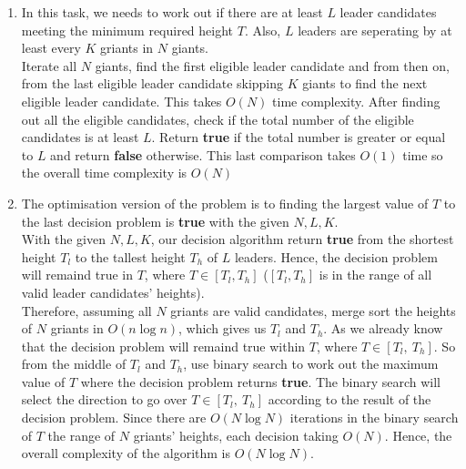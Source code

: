 \documentclass[a4paper]{scrartcl}
\begin{document}
\begin{enumerate}[label=(\alph*)]
  \item In this task, we needs to work out if there are at least $L$ leader candidates meeting the minimum required height $T$. Also, $L$ leaders are seperating by at least every $K$ griants in $N$ giants.\\
  Iterate all $N$ giants, find the first eligible leader candidate and from then on, from the last eligible leader candidate skipping $K$ giants to find the next eligible leader candidate. This takes $O(N)$ time complexity.
  After finding out all the eligible candidates, check if the total number of the eligible candidates is at least $L$. Return \textbf{true} if the total number is greater or equal to $L$ and return \textbf{false} otherwise. This last comparison takes $O(1)$ time so the overall time complexity is $O(N)$
  \item The optimisation version of the problem is to finding the largest value of $T$ to the last decision problem is {\bfseries true} with the given $N, L, K$.\\
  With the given $N, L, K$, our decision algorithm return \textbf{true} from the shortest height $T_{l}$ to the tallest height $T_{h}$ of $L$ leaders. Hence, the decision problem will remaind true in $T$, where $T \in [T_{l}, T_{h}]$ ($ [T_{l}, T_{h}]$ is in the range of all valid leader candidates' heights).\\
  Therefore, assuming all $N$ griants are valid candidates, merge sort the heights of $N$ griants in $O(n\log{n})$, which gives us $T_{l}$ and $T_{h}$. As we already know that the decision problem will remaind true within $T$, where $T \in [T_{l},\ T_{h}]$. So from the middle of $T_{l}$ and $T_{h}$, use binary search to work out the maximum value of $T$ where the decision problem returns \textbf{true}. The binary search will select the direction to go over $T \in [T_{l},\ T_{h}]$ according to the result of the decision problem. Since there are $O(N\log{N})$ iterations in the binary search of $T$ the range of $N$ griants' heights, each decision taking $O(N)$. Hence, the overall complexity of the algorithm is $O(N\log{N})$.
\end{enumerate}
\end{document}
